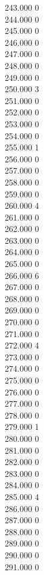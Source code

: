 { 243.000	0 \\
 244.000	0 \\
 245.000	0 \\
 246.000	0 \\
 247.000	0 \\
 248.000	0 \\
 249.000	0 \\
 250.000	3 \\
 251.000	0 \\
 252.000	0 \\
 253.000	0 \\
 254.000	0 \\
 255.000	1 \\
 256.000	0 \\
 257.000	0 \\
 258.000	0 \\
 259.000	0 \\
 260.000	4 \\
 261.000	0 \\
 262.000	0 \\
 263.000	0 \\
 264.000	0 \\
 265.000	0 \\
 266.000	6 \\
 267.000	0 \\
 268.000	0 \\
 269.000	0 \\
 270.000	0 \\
 271.000	0 \\
 272.000	4 \\
 273.000	0 \\
 274.000	0 \\
 275.000	0 \\
 276.000	0 \\
 277.000	0 \\
 278.000	0 \\
 279.000	1 \\
 280.000	0 \\
 281.000	0 \\
 282.000	0 \\
 283.000	0 \\
 284.000	0 \\
 285.000	4 \\
 286.000	0 \\
 287.000	0 \\
 288.000	0 \\
 289.000	0 \\
 290.000	0 \\
 291.000	0 \\
}
